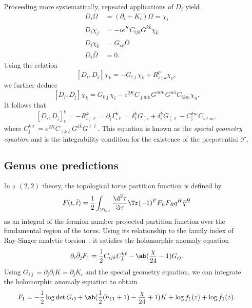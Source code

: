 \documentclass[10pt]{amsart}
\theoremstyle{definition}
\theoremstyle{remark}
\theoremstyle{plain}
\theoremstyle{definition}
\theoremstyle{remark}
\newcommand{\mc}[1]{\mathcal{#1}}
\newcommand{\ms}[1]{\mathsf{#1}}
\newcommand{\1}{\mathbf{1}}
\newcommand{\2}{\mathbf{2}}
\newcommand{\3}{\mathbf{3}}
\begin{document}
Proceeding more systematically, repeated applications of $D_i$ yield
\begin{align*}
    D_i \Omega &= (\partial_i + K_i)\Omega = \chi_i \\
    D_i \chi_j &= -ie^{K} C_{ijk} G^{k\bar{k}}\chi_{\bar{k}} \\
    D_i \chi_{\bar{k}} &= G_{i\bar{k}} \bar{\Omega} \\
    D_i \bar{\Omega} &= 0.
\end{align*}
Using the relation
\[ [D_i, D_j] \chi_k = -G_{i\bar{\jmath}} \chi_k + R_{i\bar{\jmath}k}^p \chi_p, \]
we further deduce
\[ [D_i, D_{\bar{\jmath}}] \chi_k  = G_{k\bar{\jmath}} \chi_i - e^{2K} C_{\bar{\jmath}\bar{m}\bar{n}} G^{m\bar{m}} G^{n\bar{n}} C_{ikm} \chi_n. \]
It follows that
\[ [D_i, D_{\bar{\jmath}}]_{\ell}^k = -R_{i\bar{\jmath}\ell}^k = \partial_{\bar{\jmath}} \Gamma_{i\ell}^k = \delta_{\ell}^k G_{\bar{\jmath}i} + \delta_i^k G_{\bar{\jmath}\ell} - C_{\bar{\jmath}}^{km} C_{i\ell m}, \]
where $C_{\bar{\jmath}}^{k\ell} = e^{2K} C_{\bar{\jmath}\bar{k}\bar{\ell}} G^{k\bar{k}} G^{\ell\bar{\ell}}$. This equation is known as the \textit{special geometry equation} and is the integrability condition for the existence of the prepotential $\mc{F}$.

\subsection{Genus one predictions}%
\label{sub:Genus one predictions}

In a $(2,2)$ theory, the topological torus partition function is defined by
\[ F(t, \bar{t}) = \frac{1}{2} \int_{\mc{F}_{\ms{fund}}} \frac{\d^2 \tau}{\Im \tau} \Tr(-1)^F F_L F_R q^H \bar{q}^{\bar{H}} \]
as an integral of the fermion number projected partition function over the fundamental region of the torus. Using its relationship to the family index of Ray-Singer analytic torsion~\cite{analytictorsion}, it satisfies the holomorphic anomaly equation
\[ \partial_i \bar{\partial}_{\bar{\jmath}} F_1 = \frac{1}{2} C_{ijk} C_{\bar{\jmath}}^{k\ell} - \ab(\frac{\chi}{24}-1) G_{i\bar{\jmath}}. \]
Using $G_{i\bar{\jmath}} = \partial_{\bar{\jmath}} \partial_i K = \partial_{\bar{\jmath}} K_i$ and the special geometry equation, we can integrate the holomorphic anomaly equation to obtain
\begin{equation}\label{eqn:f1}
 F_1 = -\frac{1}{2} \log \det G_{i\bar{\jmath}} + \ab(\frac{1}{2}(h_{11}+1) - \frac{\chi}{24} + 1)K + \log f_1(z) + \log f_1(\bar{z}). 
\end{equation}
\end{document}
